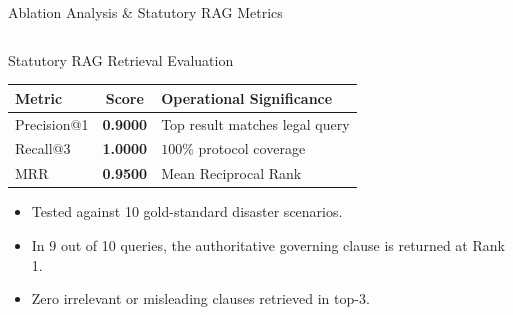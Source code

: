 \documentclass[aspectratio=169, 10pt, professionalfonts]{beamer}
\begin{document}
\begin{frame}{Ablation Analysis \& Statutory RAG Metrics}
\begin{columns}[T]
    \begin{column}{0.48\textwidth}
      \begin{block}{Statutory RAG Retrieval Evaluation}
        \footnotesize
        \begin{table}[h]
          \scriptsize
          \begin{tabularx}{\textwidth}{l C l}
            \toprule
            \textbf{Metric} & \textbf{Score} & \textbf{Operational Significance} \\
            \midrule
            Precision@1 & \textbf{0.9000} & Top result matches legal query \\
            Recall@3 & \textbf{1.0000} & $100\%$ protocol coverage \\
            MRR & \textbf{0.9500} & Mean Reciprocal Rank \\
            \bottomrule
          \end{tabularx}
        \end{table}
        \vspace{-0.4em}
        \begin{itemize}\scriptsize
          \item Tested against 10 gold-standard disaster scenarios.
          \item In 9 out of 10 queries, the authoritative governing clause is returned at Rank 1.
          \item Zero irrelevant or misleading clauses retrieved in top-3.
        \end{itemize}
      \end{block}
    \end{column}
  \end{columns}
\end{frame}
\end{document}
